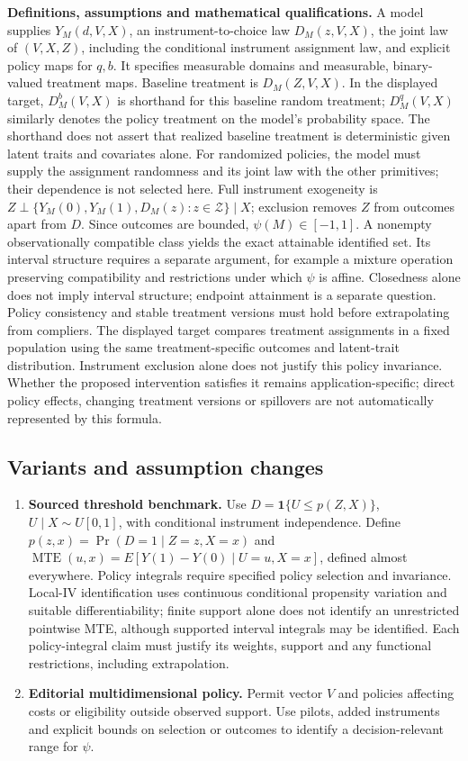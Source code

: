 \documentclass[11pt,a4paper]{article}
\begin{document}
\textbf{Definitions, assumptions and mathematical qualifications.} A model supplies \(Y_M(d,V,X)\), an instrument-to-choice law \(D_M(z,V,X)\), the joint law of \((V,X,Z)\), including the conditional instrument assignment law, and explicit policy maps for \(q,b\). It specifies measurable domains and measurable, binary-valued treatment maps. Baseline treatment is \(D_M(Z,V,X)\). In the displayed target, \(D_M^b(V,X)\) is shorthand for this baseline random treatment; \(D_M^q(V,X)\) similarly denotes the policy treatment on the model's probability space. The shorthand does not assert that realized baseline treatment is deterministic given latent traits and covariates alone. For randomized policies, the model must supply the assignment randomness and its joint law with the other primitives; their dependence is not selected here. Full instrument exogeneity is \(Z\perp\{Y_M(0),Y_M(1),D_M(z):z\in\mathcal Z\}\mid X\); exclusion removes \(Z\) from outcomes apart from \(D\). Since outcomes are bounded, \(\psi(M)\in[-1,1]\). A nonempty observationally compatible class yields the exact attainable identified set. Its interval structure requires a separate argument, for example a mixture operation preserving compatibility and restrictions under which \(\psi\) is affine. Closedness alone does not imply interval structure; endpoint attainment is a separate question. Policy consistency and stable treatment versions must hold before extrapolating from compliers. The displayed target compares treatment assignments in a fixed population using the same treatment-specific outcomes and latent-trait distribution. Instrument exclusion alone does not justify this policy invariance. Whether the proposed intervention satisfies it remains application-specific; direct policy effects, changing treatment versions or spillovers are not automatically represented by this formula.
\subsection*{Variants and assumption changes}
\begin{enumerate}
\item \textbf{Sourced threshold benchmark.} Use \(D=\mathbf1\{U\leq p(Z,X)\}\), \(U\mid X\sim U[0,1]\), with conditional instrument independence. Define \(p(z,x)=\Pr(D=1\mid Z=z,X=x)\) and \(\operatorname{MTE}(u,x)=E[Y(1)-Y(0)\mid U=u,X=x]\), defined almost everywhere. Policy integrals require specified policy selection and invariance. Local-IV identification uses continuous conditional propensity variation and suitable differentiability; finite support alone does not identify an unrestricted pointwise MTE, although supported interval integrals may be identified. Each policy-integral claim must justify its weights, support and any functional restrictions, including extrapolation.
\item \textbf{Editorial multidimensional policy.} Permit vector \(V\) and policies affecting costs or eligibility outside observed support. Use pilots, added instruments and explicit bounds on selection or outcomes to identify a decision-relevant range for \(\psi\).
\end{enumerate}
\end{document}
